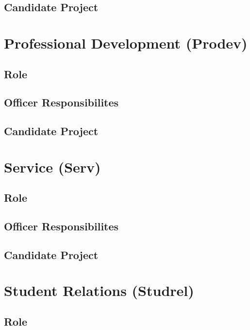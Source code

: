 \documentclass[11pt, article, oneside]{memoir}
\begin{document}
    \subsection{Candidate Project}

    \bigbreak

    
    \section{Professional Development (Prodev)}
    \subsection{Role}

    \subsection{Officer Responsibilites}

    \subsection{Candidate Project}


    \bigbreak

    
    \section{Service (Serv)}
    \subsection{Role}

    \subsection{Officer Responsibilites}

    \subsection{Candidate Project}


    \bigbreak

    
    \section{Student Relations (Studrel)}
    \subsection{Role}
\end{document}
